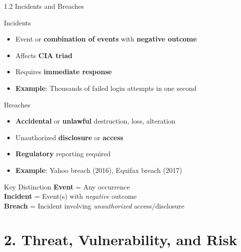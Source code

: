 \documentclass[9pt]{beamer}  %
\begin{document}
	\begin{frame}{1.2 Incidents and Breaches}
		\begin{block}{Incidents}
			\begin{itemize}
				\item Event or \textbf{combination of events} with \textbf{negative outcome}
				\item Affects \textbf{CIA triad}
				\item Requires \textbf{immediate response}
				\item \textbf{Example}: Thousands of failed login attempts in one second
			\end{itemize}
		\end{block}
		
		\begin{block}{Breaches}
			\begin{itemize}
				\item \textbf{Accidental} or \textbf{unlawful} destruction, loss, alteration
				\item Unauthorized \textbf{disclosure} or \textbf{access}
				\item \textbf{Regulatory} reporting required
				\item \textbf{Example}: Yahoo breach (2016), Equifax breach (2017)
			\end{itemize}
		\end{block}
		
		\begin{exampleblock}{Key Distinction}
			\centering
			\textbf{Event} = Any occurrence \\
			\textbf{Incident} = Event(s) with \textit{negative} outcome \\
			\textbf{Breach} = Incident involving \textit{unauthorized} access/disclosure
		\end{exampleblock}
	\end{frame}
	
	\section{2. Threat, Vulnerability, and Risk}
	
\end{document}
